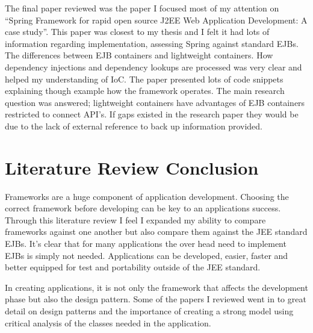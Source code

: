 \documentclass{article}
\begin{document}
The final paper reviewed was the paper I focused most of my attention on “Spring Framework for rapid open source J2EE Web Application Development: A case study”. This paper was closest to my thesis and I felt it had lots of information regarding implementation, assessing Spring against standard EJBs. The differences between EJB containers and lightweight containers. How dependency injections and dependency lookups are processed was very clear and helped my understanding of IoC. The paper presented lots of code snippets explaining though example how the framework operates. The main research question was answered; lightweight containers have advantages of EJB containers restricted to connect API’s. If gaps existed in the research paper they would be due to the lack of external reference to back up information provided.

\section{Literature Review Conclusion}
Frameworks are a huge component of application development. Choosing the correct framework before developing can be key to an applications success. Through this literature review I feel I expanded my ability to compare frameworks against one another but also compare them against the JEE standard EJBs. It’s clear that for many applications the over head need to implement EJBs is simply not needed. Applications can be developed, easier, faster and better equipped for test and portability outside of the JEE standard. 

In creating applications, it is not only the framework that affects the development phase but also the design pattern. Some of the papers I reviewed went in to great detail on design patterns and the importance of creating a strong model using critical analysis of the classes needed in the application.
 
\newpage
 
\end{document}
